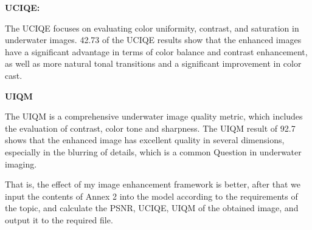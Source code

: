 \documentclass[withoutpreface,bwprint]{cumcmthesis}
\begin{document}
\vspace{0.5em}
\textbf{UCIQE:}

The UCIQE focuses on evaluating color uniformity, contrast, and saturation in underwater images. 42.73 of the UCIQE results show that the enhanced images have a significant advantage in terms of color balance and contrast enhancement, as well as more natural tonal transitions and a significant improvement in color cast.

\vspace{0.5em}
\textbf{UIQM}

The UIQM is a comprehensive underwater image quality metric, which includes the evaluation of contrast, color tone and sharpness. The UIQM result of 92.7 shows that the enhanced image has excellent quality in several dimensions, especially in the blurring of details, which is a common Question in underwater imaging.

That is, the effect of my image enhancement framework is better, after that we input the contents of Annex 2 into the model according to the requirements of the topic, and calculate the PSNR, UCIQE, UIQM of the obtained image, and output it to the required file.

\begin{table}[h!]
\centering
{}
\caption{} %
\label{tab:your_label} %
\end{table}
\end{document}
